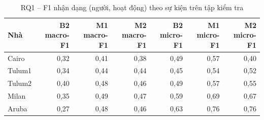 \begin{table}[htbp]
\centering
\caption{RQ1 -- F1 nhận dạng (người, hoạt động) theo sự kiện trên tập kiểm tra}
\label{tab:rq1}
\small
\begin{tabular}{lrrrrrr}
\toprule
Nhà & B2 macro-F1 & M1 macro-F1 & M2 macro-F1 & B2 micro-F1 & M1 micro-F1 & M2 micro-F1 \\
\midrule
Cairo & 0{,}32 & 0{,}41 & 0{,}38 & 0{,}49 & 0{,}57 & 0{,}40 \\
Tulum1 & 0{,}34 & 0{,}44 & 0{,}44 & 0{,}45 & 0{,}54 & 0{,}52 \\
Tulum2 & 0{,}40 & 0{,}48 & 0{,}46 & 0{,}49 & 0{,}57 & 0{,}55 \\
Milan & 0{,}35 & 0{,}49 & 0{,}47 & 0{,}59 & 0{,}69 & 0{,}67 \\
Aruba & 0{,}27 & 0{,}48 & 0{,}46 & 0{,}63 & 0{,}76 & 0{,}76 \\
\bottomrule
\end{tabular}
\end{table}
